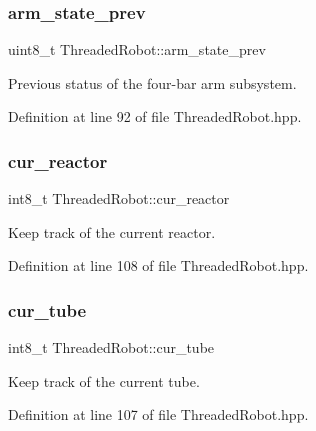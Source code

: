 \subsubsection{\texorpdfstring{arm\+\_\+state\+\_\+prev}{arm\_state\_prev}}
{\footnotesize\ttfamily uint8\+\_\+t Threaded\+Robot\+::arm\+\_\+state\+\_\+prev\hspace{0.3cm}{\ttfamily [private]}}



Previous status of the four-\/bar arm subsystem. 



Definition at line 92 of file Threaded\+Robot.\+hpp.

\mbox{\label{class_threaded_robot_a3c2f2358f32ba58846b13e95b3c55527}} 
\subsubsection{\texorpdfstring{cur\+\_\+reactor}{cur\_reactor}}
{\footnotesize\ttfamily int8\+\_\+t Threaded\+Robot\+::cur\+\_\+reactor\hspace{0.3cm}{\ttfamily [private]}}



Keep track of the current reactor. 



Definition at line 108 of file Threaded\+Robot.\+hpp.

\mbox{\label{class_threaded_robot_ac68916b337d845b298d7e66f2f9261d7}} 
\subsubsection{\texorpdfstring{cur\+\_\+tube}{cur\_tube}}
{\footnotesize\ttfamily int8\+\_\+t Threaded\+Robot\+::cur\+\_\+tube\hspace{0.3cm}{\ttfamily [private]}}



Keep track of the current tube. 



Definition at line 107 of file Threaded\+Robot.\+hpp.

